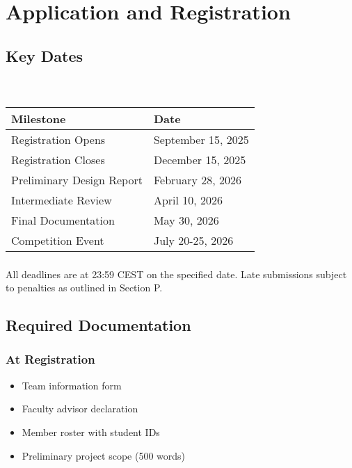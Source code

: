 
\renewcommand{\thesection}{R}
\section{Application and Registration}

\subsection{Key Dates}

\subsubsection{}\\
\begin{tabular}{ll}
\toprule
Milestone & Date \\
\midrule
Registration Opens & September 15, 2025 \\
Registration Closes & December 15, 2025 \\
Preliminary Design Report & February 28, 2026 \\
Intermediate Review & April 10, 2026 \\
Final Documentation & May 30, 2026 \\
Competition Event & July 20-25, 2026 \\
\bottomrule
\end{tabular}

\subsubsection{}
All deadlines are at 23:59 CEST on the specified date. Late submissions subject to penalties as outlined in Section P.

\subsection{Required Documentation}

\subsubsection{At Registration}
\begin{itemize}[noitemsep]
    \item Team information form
    \item Faculty advisor declaration
    \item Member roster with student IDs
    \item Preliminary project scope (500 words)
\end{itemize}

